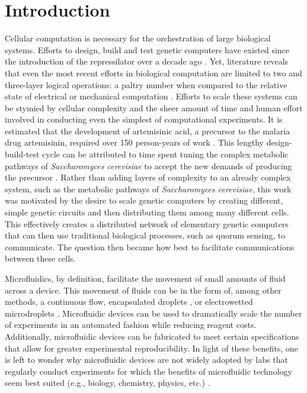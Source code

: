 \chapter{Introduction}
\label{chapter:Introduction}
\thispagestyle{myheadings}


Cellular computation is necessary for the orchestration of large biological systems. Efforts to design, build and test genetic computers have existed since the introduction of the repressilator over a decade ago \cite{elowitz2000}. Yet, literature reveals that even the most recent efforts in biological computation are limited to two and three-layer logical operations: a paltry number when compared to the relative state of electrical or mechanical computation \cite{nielsen2016genetic}. Efforts to scale these systems can be stymied by cellular complexity and the sheer amount of time and human effort involved in conducting even the simplest of computational experiments. It is estimated that the development of artemisinic acid, a precursor to the malaria drug artemisinin, required over 150 person-years of work \cite{kwok2010five}. This lengthy design-build-test cycle can be attributed to time spent tuning the complex metabolic pathways of \textit{Saccharomyces cerevisiae} to accept the new demands of producing the precursor \cite{artemisin}. Rather than adding layers of complexity to an already complex system, such as the metabolic pathways of \textit{Saccharomyces cerevisiae}, this work was motivated by the desire to scale genetic computers by creating different, simple genetic circuits and then distributing them among many different cells. This effectively creates a distributed network of elementary genetic computers that can then use traditional biological processes, such as quorum sensing, to communicate. The question then became how best to facilitate communications between these cells. 

Microfluidics, by definition, facilitate the movement of small amounts of fluid across a device. This movement of fluids can be in the form of, among other methods, a continuous flow, encapsulated droplets \cite{teh2008droplet}, or electrowetted microdroplets \cite{kim2001micropumping}. Microfluidic devices can be used to dramatically scale the number of experiments in an automated fashion while reducing reagent costs. Additionally, microfluidic devices can be fabricated to meet certain specifications that allow for greater experimental reproducibility. In light of these benefits, one is left to wonder why microfluidic devices are not widely adopted by labs that regularly conduct experiments for which the benefits of microfluidic technology seem best suited (e.g., biology, chemistry, physics, etc.) \cite{whitesides2006}. 

